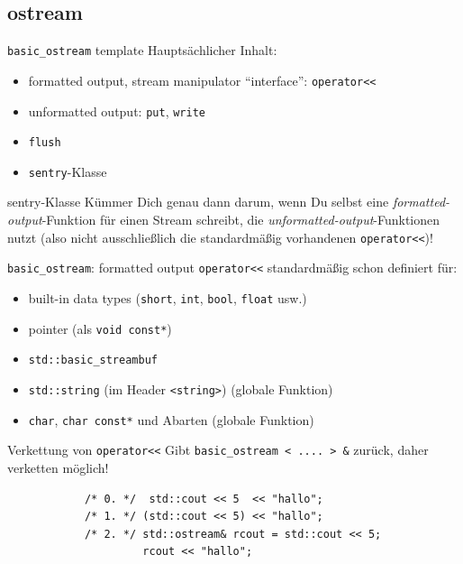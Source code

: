 \subsection{ostream}

\begin{frame}{\texttt{basic\_ostream} template}
	Hauptsächlicher Inhalt:
	\begin{itemize}
		\item formatted output, stream manipulator \enquote{interface}: \texttt{operator<<}
		\item unformatted output: \texttt{put}, \texttt{write}
		\item \texttt{flush}
		\item \texttt{sentry}-Klasse
	\end{itemize}
	
	\pause
	\vspace{2em}
	
	\begin{block}{sentry-Klasse}
		Kümmer Dich genau dann darum, wenn Du selbst eine \emph{formatted-output}-Funktion für einen Stream schreibt, die \emph{unformatted-output}-Funktionen nutzt (also nicht ausschließlich die standardmäßig vorhandenen \texttt{operator<<})!
	\end{block}
\end{frame}

\begin{frame}[fragile]{\texttt{basic\_ostream}: formatted output}
	\texttt{operator<<} standardmäßig schon definiert für:
	\begin{itemize}
		\item built-in data types (\texttt{short}, \texttt{int}, \texttt{bool}, \texttt{float} usw.)
		\item pointer (als \texttt{void const*})
		\item \texttt{std::basic\_streambuf}
		\item \texttt{std::string} (im Header \texttt{<string>}) {\tiny (globale Funktion)}
		\item \texttt{char}, \texttt{char const*} und Abarten {\tiny (globale Funktion)}
	\end{itemize}
	
	\pause
	\vspace{0.5em}
	
	\begin{block}{Verkettung von \texttt{operator<<}}
		Gibt \texttt{basic\_ostream < .... > \&} zurück, daher verketten möglich!
		\begin{lstlisting}
			/* 0. */  std::cout << 5  << "hallo";
			/* 1. */ (std::cout << 5) << "hallo";
			/* 2. */ std::ostream& rcout = std::cout << 5;
			         rcout << "hallo";
		\end{lstlisting}
	\end{block}
\end{frame}

